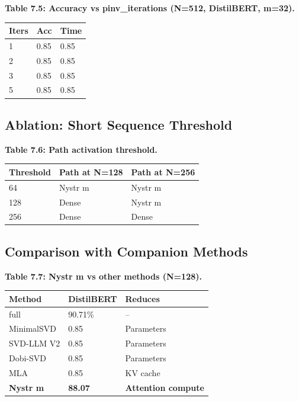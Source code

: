 \textbf{Table 7.5: Accuracy vs pinv\_iterations (N=512, DistilBERT, m=32).}

\begin{table}[H]
\centering
\small
\begin{tabular}{lll}
\toprule
\textbf{Iters} & \textbf{Acc} & \textbf{Time} \\
\midrule
1 & 0.85 & 0.85 \\
2 & 0.85 & 0.85 \\
3 & 0.85 & 0.85 \\
5 & 0.85 & 0.85 \\
\bottomrule
\end{tabular}
\end{table}

\subsection{Ablation: Short Sequence Threshold}

\textbf{Table 7.6: Path activation threshold.}

\begin{table}[H]
\centering
\small
\begin{tabular}{lll}
\toprule
\textbf{Threshold} & \textbf{Path at N=128} & \textbf{Path at N=256} \\
\midrule
64 & Nystr m & Nystr m \\
128 & Dense & Nystr m \\
256 & Dense & Dense \\
\bottomrule
\end{tabular}
\end{table}

\subsection{Comparison with Companion Methods}

\textbf{Table 7.7: Nystr m vs other methods (N=128).}

\begin{table}[H]
\centering
\small
\begin{tabular}{lll}
\toprule
\textbf{Method} & \textbf{DistilBERT} & \textbf{Reduces} \\
\midrule
full & 90.71\% & -- \\
MinimalSVD & 0.85 & Parameters \\
SVD-LLM V2 & 0.85 & Parameters \\
Dobi-SVD & 0.85 & Parameters \\
MLA & 0.85 & KV cache \\
\textbf{Nystr m} & \textbf{88.07} & \textbf{Attention compute} \\
\bottomrule
\end{tabular}
\end{table}

